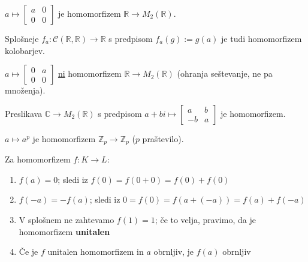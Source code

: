 \documentclass[11pt, a4paper]{article}
\begin{document}
    \begin{example}
        \(a \mapsto 
        \begin{bmatrix} 
            a & 0 \\ 
            0 & 0 
        \end{bmatrix}\) 
        je homomorfizem \(\mathbb{R} \rightarrow M_2(\mathbb{R})\).
    \end{example}

    \begin{example}
        Splošneje \(f_a: \mathscr{C}(\mathbb{R}, \mathbb{R}) \rightarrow \mathbb{R}\) s predpisom \(f_a(g) := g(a)\) je tudi homomorfizem kolobarjev.
    \end{example}

    \begin{example}
        \(a \mapsto 
            \begin{bmatrix} 
                0 & a \\ 
                0 & 0 
            \end{bmatrix}\) 
        \underline{ni} homomorfizem \(\mathbb{R} \rightarrow M_2(\mathbb{R})\) (ohranja seštevanje, ne pa množenja).
    \end{example}

    \begin{example}
        Preslikava \(\mathbb{C} \rightarrow M_2(\mathbb{R})\) s predpisom \(a + bi \mapsto 
            \begin{bmatrix}
                a & b \\
                -b & a
            \end{bmatrix}\)
        je homomorfizem.
    \end{example}

    \begin{example}
        \(a \mapsto a^p\) je homomorfizem \(\mathbb{Z}_p \rightarrow \mathbb{Z}_p\) (\(p\) praštevilo).
    \end{example}

    \begin{proposition}
        Za homomorfizem \(f: K \rightarrow L\):
        \begin{enumerate}[label=\alph*)]
            \item \(f(a) = 0\); sledi iz \(f(0) = f(0+0) = f(0) + f(0)\)
            \item \(f(-a) = -f(a)\); sledi iz \(0 = f(0) = f(a+(-a)) = f(a) + f(-a)\)
            \item V splošnem ne zahtevamo \(f(1) = 1\); če to velja, pravimo, da je homomorfizem \textbf{unitalen}
            \item Če je \(f\) unitalen homomorfizem in \(a\) obrnljiv, je \(f(a)\) obrnljiv
        \end{enumerate}
    \end{proposition}
    
\end{document}
